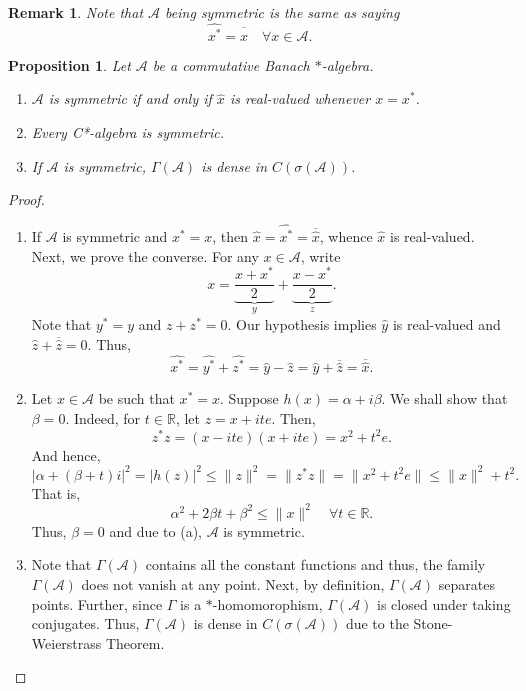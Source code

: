 \documentclass[11pt]{article}
\theoremstyle{thmstyle}
\newtheorem{proposition}[theorem]{Proposition}
\theoremstyle{defstyle}
\newtheorem{remark}[theorem]{Remark}
\newcommand{\R}{\mathbb{R}}
\newcommand{\calA}{\mathcal{A}} %
\newcommand{\wh}[1]{\widehat{#1}}
\renewcommand{\le}{\leqslant}
\begin{document}
\begin{remark}
    Note that $\calA$ being symmetric is the same as saying 
    \begin{equation*}
        \wh{x^\ast} = \overline{\wh x} \quad\forall x\in\calA.
    \end{equation*}
\end{remark}

\begin{proposition}
    Let $\calA$ be a commutative Banach $\ast$-algebra. 
    \begin{enumerate}[label=(\alph*)]
        \item $\calA$ is symmetric if and only if $\wh x$ is real-valued whenever $x = x^\ast$.
        \item Every C*-algebra is symmetric.
        \item If $\calA$ is symmetric, $\Gamma(\calA)$ is dense in $C(\sigma(\calA))$.
    \end{enumerate}
\end{proposition}
\begin{proof}
\begin{enumerate}[label=(\alph*)]
\item If $\calA$ is symmetric and $x^\ast = x$, then $\wh x = \wh{x^\ast} = \overline{\wh x}$, whence $\wh x$ is real-valued. Next, we prove the converse. For any $x\in\calA$, write 
\begin{equation*}
    x = \underbrace{\frac{x + x^\ast}{2}}_y + \underbrace{\frac{x - x^\ast}{2}}_z.
\end{equation*}
Note that $y^\ast = y$ and $z + z^\ast = 0$. Our hypothesis implies $\wh y$ is real-valued and $\wh z + \overline{\wh z} = 0$. Thus, 
\begin{equation*}
    \wh{x^\ast} = \wh{y^\ast} + \wh{z^\ast} = \wh y - \wh{z} = \wh y + \overline{\wh z} = \overline{\wh x}.
\end{equation*}
\item Let $x\in\calA$ be such that $x^\ast = x$. Suppose $h(x) = \alpha + i\beta$. We shall show that $\beta = 0$. Indeed, for $t\in\R$, let $z = x + it e$. Then, 
\begin{equation*}
    z^\ast z = (x - ite)(x + ite) = x^2 + t^2e.
\end{equation*}
And hence, 
\begin{equation*}
    |\alpha + (\beta + t)i|^2 = |h(z)|^2\le \|z\|^2  = \|z^\ast z\| = \|x^2 + t^2e\|\le \|x\|^2 + t^2.
\end{equation*}
That is, 
\begin{equation*}
    \alpha^2 + 2\beta t + \beta^2\le\|x\|^2\quad\forall t\in\R.
\end{equation*}
Thus, $\beta = 0$ and due to (a), $\calA$ is symmetric.
\item Note that $\Gamma(\calA)$ contains all the constant functions and thus, the family $\Gamma(\calA)$ does not vanish at any point. Next, by definition, $\Gamma(\calA)$ separates points. Further, since $\Gamma$ is a $\ast$-homomorophism, $\Gamma(\calA)$ is closed under taking conjugates. Thus, $\Gamma(\calA)$ is dense in $C(\sigma(\calA))$ due to the Stone-Weierstrass Theorem. \qedhere
\end{enumerate}
\end{proof}
\end{document}
